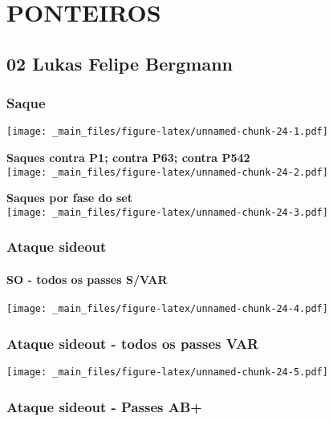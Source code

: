 \documentclass[
]{book}
\begin{document}
\section{PONTEIROS}\label{ponteiros}

\subsection{02 Lukas Felipe Bergmann}\label{lukas-felipe-bergmann}

\subsubsection{Saque}\label{saque}

\texttt{[image: \_main\_files/figure-latex/unnamed-chunk-24-1.pdf]}

\textbf{Saques contra P1; contra P63; contra P542}\\
\texttt{[image: \_main\_files/figure-latex/unnamed-chunk-24-2.pdf]}

\textbf{Saques por fase do set}\\
\texttt{[image: \_main\_files/figure-latex/unnamed-chunk-24-3.pdf]} \pagebreak

\subsubsection{Ataque sideout}\label{ataque-sideout}

\paragraph*{SO - todos os passes S/VAR}\label{so---todos-os-passes-svar}

\texttt{[image: \_main\_files/figure-latex/unnamed-chunk-24-4.pdf]}

\subsubsection*{Ataque sideout - todos os passes VAR}\label{ataque-sideout---todos-os-passes-var}

\texttt{[image: \_main\_files/figure-latex/unnamed-chunk-24-5.pdf]}

\subsubsection{Ataque sideout - Passes AB+}\label{ataque-sideout---passes-ab}
\end{document}
